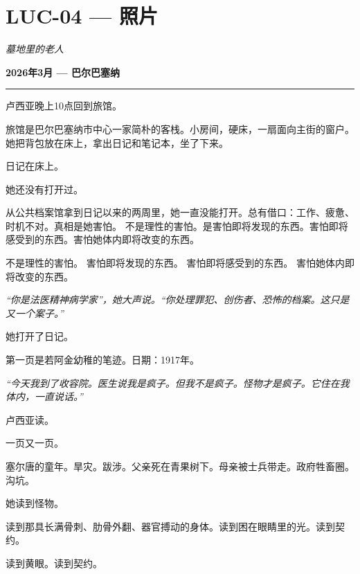 \section*{\textbf{LUC-04} --- 照片}

\noindent \textit{墓地里的老人}

\noindent \textbf{2026年3月 --- 巴尔巴塞纳}

\vspace{0.5em}\noindent\rule{\textwidth}{0.5pt}\vspace{0.5em}

\noindent 卢西亚晚上10点回到旅馆。

\noindent 旅馆是巴尔巴塞纳市中心一家简朴的客栈。小房间，硬床，一扇面向主街的窗户。她把背包放在床上，拿出日记和笔记本，坐了下来。

\noindent 日记在床上。

\noindent 她还没有打开过。

\noindent 从公共档案馆拿到日记以来的两周里，她一直没能打开。总有借口：工作、疲惫、时机不对。真相是她害怕。
\noindent 不是理性的害怕。是害怕即将发现的东西。害怕即将感受到的东西。害怕她体内即将改变的东西。

\noindent 不是理性的害怕。
\noindent 害怕即将发现的东西。
\noindent 害怕即将感受到的东西。
\noindent 害怕她体内即将改变的东西。

\noindent \textit{\textquotedblleft{}你是法医精神病学家\textquotedblright{}，她大声说。\textquotedblleft{}你处理罪犯、创伤者、恐怖的档案。这只是又一个案子。\textquotedblright{}}

\noindent 她打开了日记。

\noindent 第一页是若阿金幼稚的笔迹。日期：1917年。

\noindent \textit{\textquotedblleft{}今天我到了收容院。医生说我是疯子。但我不是疯子。怪物才是疯子。它住在我体内，一直说话。\textquotedblright{}}

\noindent 卢西亚读。

\noindent 一页又一页。

\noindent 塞尔唐的童年。旱灾。跋涉。父亲死在青果树下。母亲被士兵带走。政府牲畜圈。沟坑。

\noindent 她读到怪物。

\noindent 读到那具长满骨刺、肋骨外翻、器官搏动的身体。读到困在眼睛里的光。读到契约。

\noindent 读到黄眼。读到契约。

